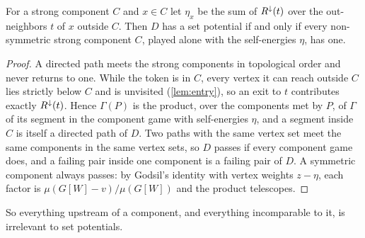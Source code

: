 \begin{lemma}[components]\label{lem:set-components}
For a strong component $C$ and $x\in C$ let $\eta_x$ be the sum of $R^{\downarrow}(t)$ over the out-neighbors $t$ of $x$ outside $C$. Then $D$ has a set potential if and only if every non-symmetric strong component $C$, played alone with the self-energies $\eta$, has one.
\end{lemma}
\begin{proof}
A directed path meets the strong components in topological order and never returns to one. While the token is in $C$, every vertex it can reach outside $C$ lies strictly below $C$ and is unvisited (\cref{lem:entry}), so an exit to $t$ contributes exactly $R^{\downarrow}(t)$. Hence $\Gamma(P)$ is the product, over the components met by $P$, of $\Gamma$ of its segment in the component game with self-energies $\eta$, and a segment inside $C$ is itself a directed path of $D$. Two paths with the same vertex set meet the same components in the same vertex sets, so $D$ passes if every component game does, and a failing pair inside one component is a failing pair of $D$. A symmetric component always passes: by Godsil's identity with vertex weights $z-\eta$, each factor is $\mu(G[W]-v)/\mu(G[W])$ and the product telescopes.
\end{proof}

So everything upstream of a component, and everything incomparable to it, is irrelevant to set potentials.

